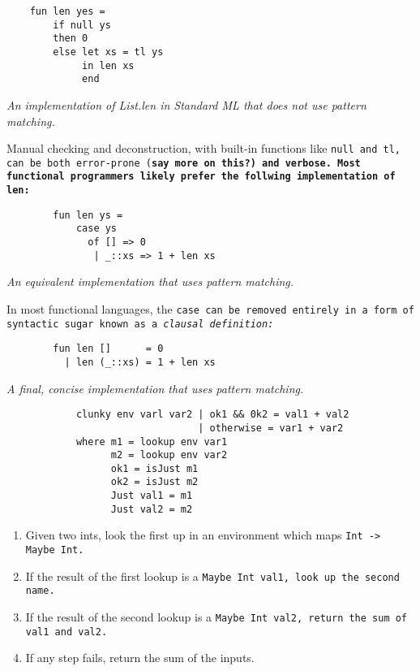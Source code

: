 \documentclass[manuscript,screen,review, 12pt]{acmart}
\begin{document}
    
    \smllst
    
    \begin{lstlisting}
    fun len yes =
        if null ys 
        then 0 
        else let xs = tl ys 
             in len xs 
             end 
    \end{lstlisting}
    \it{An implementation of List.len in Standard ML that does not use pattern 
        matching.}
    
    Manual checking and deconstruction, with built-in functions like \tt{null} and
    \tt{tl}, can be both error-prone (\bf{say more on this?}) and verbose. Most
    functional programmers likely prefer the follwing implementation of \tt{len}:
    
    \begin{lstlisting}
        fun len ys =
            case ys 
              of [] => 0
               | _::xs => 1 + len xs
        \end{lstlisting}
    
    \it{An equivalent implementation that uses pattern matching.}
    
    In most functional languages, the \tt{case} can be removed entirely in a form of
    syntactic sugar known as a \it{clausal definition}:
    \begin{lstlisting}
        fun len []      = 0
          | len (_::xs) = 1 + len xs
        \end{lstlisting}
    
    \it{A final, concise implementation that uses pattern matching.}

        \begin{verbatim}
            clunky env varl var2 | ok1 && 0k2 = val1 + val2 
                                 | otherwise = var1 + var2 
            where m1 = lookup env var1 
                  m2 = lookup env var2
                  ok1 = isJust m1 
                  ok2 = isJust m2 
                  Just val1 = m1 
                  Just val2 = m2    
        \end{verbatim}
        
        \begin{enumerate}
            \item Given two ints, look the first up in an environment which maps \tt{Int -> Maybe Int}.
            \item If the result of the first lookup is a \tt{Maybe Int val1}, look up the second name. 
            \item If the result of the second lookup is a \tt{Maybe Int val2}, return the sum of \tt{val1} and \tt{val2}. 
            \item If any step fails, return the sum of the inputs. 
        \end{enumerate}
        
\end{document}
